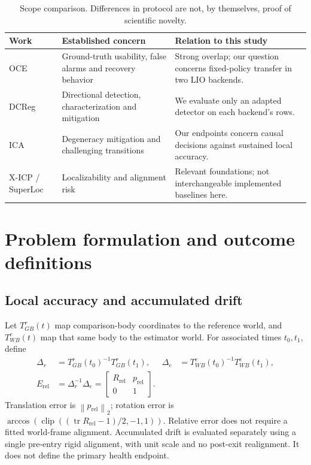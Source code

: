 \documentclass[11pt,a4paper]{article}
\newcommand{\norm}[1]{\left\lVert#1\right\rVert}
\begin{document}
\begin{table}[htbp]
\centering\small
\begin{tabularx}{\linewidth}{@{}p{.15\linewidth}XX@{}}
\toprule Work & Established concern & Relation to this study\\\midrule
OCE & Ground-truth usability, false alarms and recovery behavior & Strong
overlap; our question concerns fixed-policy transfer in two LIO backends.\\
DCReg & Directional detection, characterization and mitigation & We evaluate
only an adapted detector on each backend's rows.\\
ICA & Degeneracy mitigation and challenging transitions & Our endpoints
concern causal decisions against sustained local accuracy.\\
X-ICP / SuperLoc & Localizability and alignment risk & Relevant foundations;
not interchangeable implemented baselines here.\\
\bottomrule
\end{tabularx}
\caption{Scope comparison. Differences in protocol are not, by themselves,
proof of scientific novelty.}\label{tab:overlap}
\end{table}

\section{Problem formulation and outcome definitions}
\subsection{Local accuracy and accumulated drift}
Let $T^r_{GB}(t)$ map comparison-body coordinates to the reference world,
and $T^e_{WB}(t)$ map that same body to the estimator world. For associated
times $t_0,t_1$, define
\begin{align}
\Delta_r&=T^r_{GB}(t_0)^{-1}T^r_{GB}(t_1),&
\Delta_e&=T^e_{WB}(t_0)^{-1}T^e_{WB}(t_1),\\
E_{\mathrm{rel}}&=\Delta_r^{-1}\Delta_e
=\begin{bmatrix}R_{\mathrm{rel}}&p_{\mathrm{rel}}\\0&1\end{bmatrix}.
\end{align}
Translation error is $\norm{p_{\mathrm{rel}}}_2$; rotation error is
$\arccos(\operatorname{clip}((\operatorname{tr}R_{\mathrm{rel}}-1)/2,-1,1))$.
Relative error does not require a fitted world-frame alignment.
Accumulated drift is evaluated separately using a single pre-entry rigid
alignment, with unit scale and no post-exit realignment. It does not define
the primary health endpoint.
\end{document}
